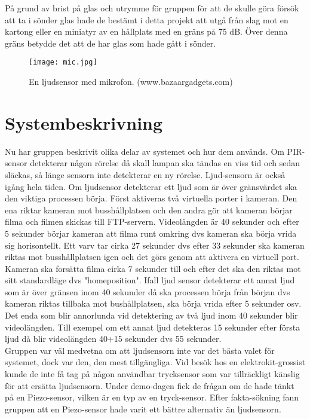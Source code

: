 På grund av brist på glas och utrymme för gruppen för att de skulle  göra försök att ta i sönder glas hade de bestämt i detta projekt att utgå från slag mot en kartong eller en miniatyr av en hållplats med en gräns på 75 dB. Över denna gräns betydde det att de har glas som hade gått i sönder.\\
\begin{figure}[h]

  \texttt{[image: mic.jpg]}
  \caption{En ljudsensor med mikrofon. (www.bazaargadgets.com)}
  \label{fig:mic}
\end{figure}
\clearpage
\section{Systembeskrivning}
Nu har gruppen beskrivit olika delar av systemet och hur dem används. Om PIR-sensor detekterar någon rörelse då skall lampan ska tändas en viss tid och sedan släckas, så länge sensorn inte detekterar en ny rörelse. Ljud-sensorn är också igång hela tiden. Om ljudsensor detekterar ett ljud som är över gränsvärdet ska den viktiga processen börja. Först aktiveras två virtuella porter i kameran. Den ena riktar kameran mot busshållplatsen och den andra gör att kameran börjar filma och filmen skickas till FTP-servern. Videolängden är 40 sekunder och efter 5 sekunder börjar kameran att filma runt omkring dvs kameran ska börja vrida sig horisontellt. Ett varv tar cirka 27 sekunder dvs efter 33 sekunder ska kameran riktas mot busshållplatsen igen och det görs genom att aktivera en virtuell port. Kameran ska forsätta filma cirka 7 sekunder till och efter det ska den riktas mot sitt standardläge dvs "homeposition". Ifall ljud sensor detekterar ett annat ljud som är över gränsen inom 40 sekunder då ska processen börja från början dvs kameran riktas tillbaka mot bushållplatsen, ska börja vrida efter 5 sekunder osv. Det enda som blir annorlunda vid detektering av två ljud inom 40 sekunder blir videolängden. Till exempel om ett annat ljud detekteras 15 sekunder efter första ljud då blir videolängden 40+15 sekunder dvs 55 sekunder.\\
Gruppen var väl medvetna om att ljudsensorn inte var det bästa valet för systemet, dock var den, den mest tillgängliga. Vid besök hos en elektrokit-grossist kunde de inte få tag på någon användbar trycksensor som var tillräckligt känslig för att ersätta ljudsensorn. Under demo-dagen fick de frågan om de hade tänkt på en Piezo-sensor, vilken är en typ av en tryck-sensor. Efter fakta-sökning fann gruppen att en Piezo-sensor hade varit ett bättre alternativ än ljudsensorn.

